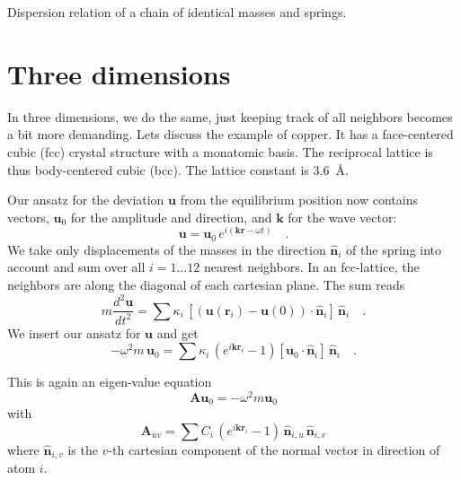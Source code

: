 \begin{marginfigure}

\caption{Dispersion relation of a chain of identical masses and springs.}
\end{marginfigure}




\section{Three dimensions}

In three dimensions, we do the same, just keeping track of all neighbors becomes a bit more demanding. Lets discuss the example of 
copper. It has  a face-centered cubic (fcc) crystal structure with a monatomic basis. The reciprocal lattice is thus  body-centered cubic (bcc). The lattice constant is 3.6~\AA.

Our ansatz for the deviation $\mathbf{u}$ from the equilibrium position now contains vectors, $\mathbf{u}_0$ for the amplitude and direction, and $\mathbf{k}$ for the wave vector:
\begin{equation}
  \mathbf{u} = \mathbf{u}_0 \, e^{i ( \mathbf{k} \mathbf{r} - \omega t)} \quad .
\end{equation}
We take only displacements of the masses in the direction $\mathbf{\hat{n}}_i$ of the spring into account and sum over all $i=1 \dots 12$ nearest neighbors. In an fcc-lattice, the neighbors are along the diagonal of each cartesian plane. The sum reads
\begin{equation}
m \frac{d^2 \mathbf{u}}{dt^2} = \sum \kappa_{i} \, [ (\mathbf{u}(\mathbf{r}_i) - \mathbf{u}(0) ) \cdot \mathbf{\hat{n}}_i ]\,  \mathbf{\hat{n}}_i  \quad .
\end{equation}
We insert our ansatz for  $\mathbf{u}$ and get
\begin{equation}
  - \omega^2 m \, \mathbf{u}_0 
 = \sum \kappa_{i} \,  ( e^{i \mathbf{k} \mathbf{r}_i } - 1) [\mathbf{u}_0 \cdot \mathbf{\hat{n}}_i ]\,  \mathbf{\hat{n}}_i \quad .
\end{equation}

This is again an eigen-value equation
\begin{equation}
\mathbf{A} \mathbf{u}_0 = - \omega^2 m \mathbf{u}_0
\end{equation}
with 
\begin{equation}
\mathbf{A}_{uv} = \sum C_{i} \,  ( e^{i \mathbf{k} \mathbf{r}_i } - 1)  \, \mathbf{\hat{n}}_{i, u} \, \mathbf{\hat{n}}_{i, v}
\end{equation}
where $\mathbf{\hat{n}}_{i, v}$ is the $v$-th cartesian component of the normal vector in direction of atom $i$.

